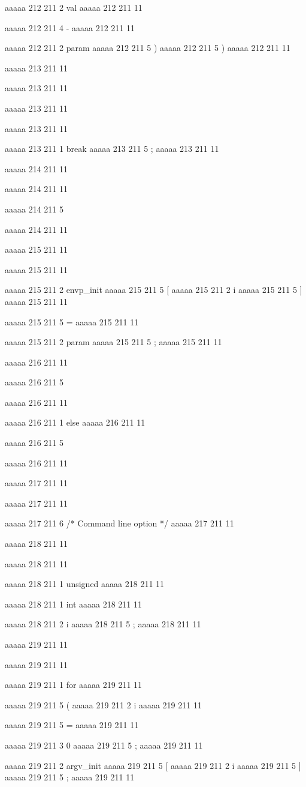{{{aaaaa 212 211
2
val
aaaaa 212 211
11
 
aaaaa 212 211
4
-
aaaaa 212 211
11
 
aaaaa 212 211
2
param
aaaaa 212 211
5
)
aaaaa 212 211
5
)
aaaaa 212 211
11


aaaaa 213 211
11
	
aaaaa 213 211
11
	
aaaaa 213 211
11
	
aaaaa 213 211
11
	
aaaaa 213 211
1
break
aaaaa 213 211
5
;
aaaaa 213 211
11


aaaaa 214 211
11
	
aaaaa 214 211
11
	
aaaaa 214 211
5
}
aaaaa 214 211
11


aaaaa 215 211
11
	
aaaaa 215 211
11
	
aaaaa 215 211
2
envp_init
aaaaa 215 211
5
[
aaaaa 215 211
2
i
aaaaa 215 211
5
]
aaaaa 215 211
11
 
aaaaa 215 211
5
=
aaaaa 215 211
11
 
aaaaa 215 211
2
param
aaaaa 215 211
5
;
aaaaa 215 211
11


aaaaa 216 211
11
	
aaaaa 216 211
5
}
aaaaa 216 211
11
 
aaaaa 216 211
1
else
aaaaa 216 211
11
 
aaaaa 216 211
5
{
aaaaa 216 211
11


aaaaa 217 211
11
	
aaaaa 217 211
11
	
aaaaa 217 211
6
/* Command line option */
aaaaa 217 211
11


aaaaa 218 211
11
	
aaaaa 218 211
11
	
aaaaa 218 211
1
unsigned
aaaaa 218 211
11
 
aaaaa 218 211
1
int
aaaaa 218 211
11
 
aaaaa 218 211
2
i
aaaaa 218 211
5
;
aaaaa 218 211
11


aaaaa 219 211
11
	
aaaaa 219 211
11
	
aaaaa 219 211
1
for
aaaaa 219 211
11
 
aaaaa 219 211
5
(
aaaaa 219 211
2
i
aaaaa 219 211
11
 
aaaaa 219 211
5
=
aaaaa 219 211
11
 
aaaaa 219 211
3
0
aaaaa 219 211
5
;
aaaaa 219 211
11
 
aaaaa 219 211
2
argv_init
aaaaa 219 211
5
[
aaaaa 219 211
2
i
aaaaa 219 211
5
]
aaaaa 219 211
5
;
aaaaa 219 211
11
 
}}
